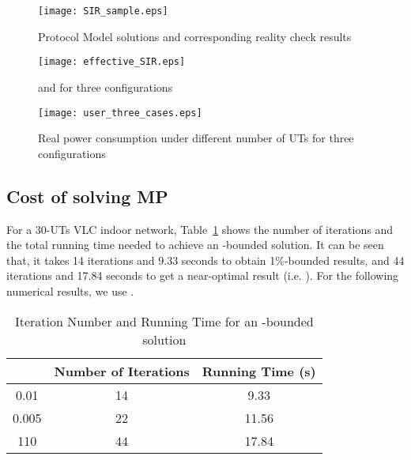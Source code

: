 \documentclass[10pt,journal]{IEEEtran}
\begin{document}
\begin{figure*}
  \centering
  \begin{minipage}[t]{.329\linewidth}
    \texttt{[image: SIR\_sample.eps]}
  \vspace{-10pt}
  \caption{Protocol Model solutions and corresponding reality check results}
  \vspace{-2pt}
  \label{fig_SIR_sample}
  \end{minipage}
  \begin{minipage}[t]{.329\linewidth}
   \texttt{[image: effective\_SIR.eps]}
  \vspace{-10pt}
  \caption{ and  for three configurations}
  \vspace{-2pt}
  \label{fig_effective_SIR}
  \end{minipage}
  \begin{minipage}[t]{.329\linewidth}
    \texttt{[image: user\_three\_cases.eps]}
  \vspace{-10pt}
  \caption{Real power consumption under different number of UTs for three configurations}
  \vspace{-2pt}
  \label{fig_user_three_cases}
  \end{minipage}
\end{figure*}

\subsection{Cost of solving MP}
For a 30-UTs VLC indoor network, Table~\ref{table_complexity} shows the number of iterations and the total running time needed to achieve an -bounded solution. It can be seen that, it takes 14 iterations and 9.33 seconds to obtain 1\%-bounded results, and 44 iterations and 17.84 seconds to get a near-optimal result (i.e. ). For the following numerical results, we use .

\begin{table}
\centering
\caption{Iteration Number and Running Time for an -bounded solution}
\begin{tabular}{|c|c|c|}
\hline
&Number of Iterations&Running Time (s)\\\hline
0.01&14&9.33\\
0.005&22&11.56\\
110&44&17.84\\
\hline
\end{tabular}
\label{table_complexity}
\end{table}
\end{document}
